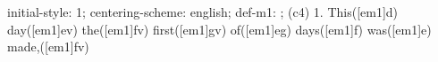 initial-style: 1;
centering-scheme: english;
def-m1: \grealign;
(c4) 1. This([em1]d) day([em1]ev) the([em1]fv) first([em1]gv) of([em1]eg) days([em1]f) was([em1]e) made,([em1]fv)